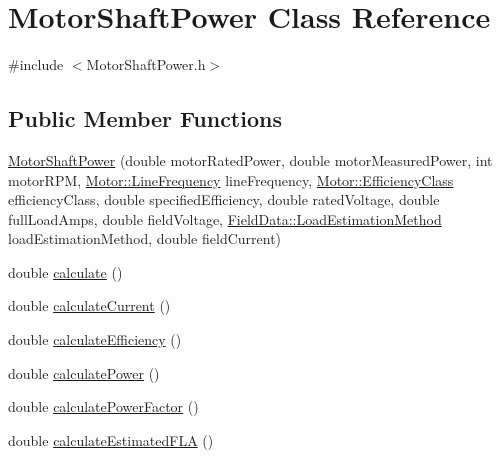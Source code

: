 \hypertarget{class_motor_shaft_power}{}\section{Motor\+Shaft\+Power Class Reference}
\label{class_motor_shaft_power}


{\ttfamily \#include $<$Motor\+Shaft\+Power.\+h$>$}

\subsection*{Public Member Functions}
\begin{DoxyCompactItemize}
\item 
\hyperlink{class_motor_shaft_power_a1695ae98d73b9813f2c049f627cc87f5}{Motor\+Shaft\+Power} (double motor\+Rated\+Power, double motor\+Measured\+Power, int motor\+R\+PM, \hyperlink{class_motor_acee1bdf1b684ad36cb80dc2829d9fcee}{Motor\+::\+Line\+Frequency} line\+Frequency, \hyperlink{class_motor_afa022971ae062406a9f588c601673d4e}{Motor\+::\+Efficiency\+Class} efficiency\+Class, double specified\+Efficiency, double rated\+Voltage, double full\+Load\+Amps, double field\+Voltage, \hyperlink{class_field_data_a424e89914ba5684c01bb269dbe3312fd}{Field\+Data\+::\+Load\+Estimation\+Method} load\+Estimation\+Method, double field\+Current)
\item 
double \hyperlink{class_motor_shaft_power_a65fc4f52753011c5a49376bc79bf81bc}{calculate} ()
\item 
double \hyperlink{class_motor_shaft_power_a3ce530d426fa14223199d89f54f34244}{calculate\+Current} ()
\item 
double \hyperlink{class_motor_shaft_power_ab7df0b41dc9d1bc6a591f0ab8f57b7ee}{calculate\+Efficiency} ()
\item 
double \hyperlink{class_motor_shaft_power_a4a2756922b290bec13550110aac25b8c}{calculate\+Power} ()
\item 
double \hyperlink{class_motor_shaft_power_aa7e9eb3a219c86f0ee0fb5b3d733b60a}{calculate\+Power\+Factor} ()
\item 
double \hyperlink{class_motor_shaft_power_a120b76be1b3b9fc3d67e37ecee0eb767}{calculate\+Estimated\+F\+LA} ()
\end{DoxyCompactItemize}
